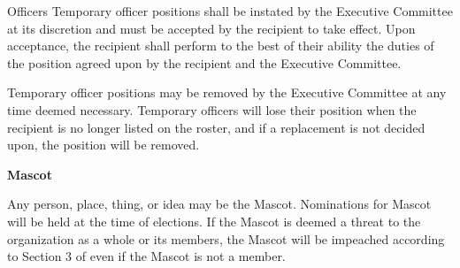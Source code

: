 {\begin{article}{Officers}
		Temporary officer positions shall be instated by the Executive Committee at its discretion and must be accepted by the recipient to take effect.  Upon acceptance, the recipient shall perform to the best of their ability the duties of the position agreed upon by the recipient and the Executive Committee.
		
		Temporary officer positions may be removed by the Executive Committee at any time deemed necessary.  Temporary officers will lose their position when the recipient is no longer listed on the roster, and if a replacement is not decided upon, the position will be removed.
		\item \textbf{Mascot}
		
		Any person, place, thing, or idea may be the Mascot.  Nominations for Mascot will be held at the time of elections.  If the Mascot is deemed a threat to the organization as a whole or its members, the Mascot will be impeached according to Section 3 of  even if the Mascot is not a member.
	\end{article}
}
